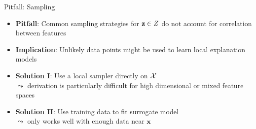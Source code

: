 \documentclass[11pt,compress,t,notes=noshow, aspectratio=169, xcolor=table]{beamer}
\begin{document}
\begin{frame}[c]{Pitfall: Sampling}
	\begin{itemize}
	\itemsep1em
	  \item \textbf{Pitfall}: Common sampling strategies for $\zv \in Z$ do not account for correlation between features 
      \item \textbf{Implication}:  Unlikely data points might be used to learn local explanation models
      \pause
      \item \textbf{Solution I}: Use a local sampler directly on $\Xspace$\\
      $\leadsto$ derivation is particularly difficult for high dimensional or mixed feature spaces 
      \item \textbf{Solution II}: Use training data to fit surrogate model\\
      $\leadsto$ only works well with enough data near $\xv$
    \end{itemize}
    
\end{frame}
\end{document}

